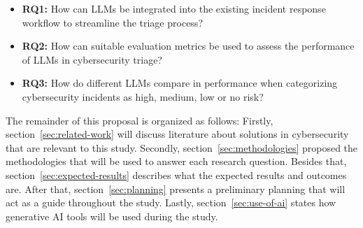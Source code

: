 \begin{itemize}
    \item \textbf{RQ1:} How can LLMs be integrated into the existing incident response workflow to streamline the triage process?
    \item \textbf{RQ2:} How can suitable evaluation metrics be used to assess the performance of LLMs in cybersecurity triage?
    \item \textbf{RQ3:} How do different LLMs compare in performance when categorizing cybersecurity incidents as high, medium, low or no risk?
\end{itemize}

The remainder of this proposal is organized as follows:
Firstly, section\ \ref{sec:related-work} will discuss literature about solutions in cybersecurity that are relevant to
this study.
Secondly, section\ \ref{sec:methodologies} proposed the methodologies that will be used to answer each research
question.
Besides that, section\ \ref{sec:expected-results} describes what the expected results and outcomes are.
After that, section\ \ref{sec:planning} presents a preliminary planning that will act as a guide throughout the study.
Lastly, section\ \ref{sec:use-of-ai} states how generative AI tools will be used during the study.
